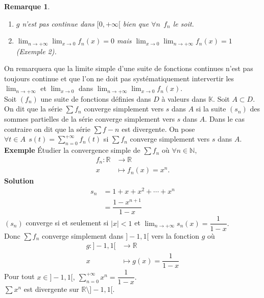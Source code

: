 \documentclass[11pt, a4paper]{book}
\newtheorem{rem}{Remarque}[section]
\begin{document}
\begin{rem} \label{rem4.2.1}
\begin{enumerate}
\item $g$ n'est pas continue dans $[0,+\infty[$ bien que $\forall n~~f_n$ le soit.
\item ${\displaystyle \lim_{n\rightarrow+\infty} \lim_{x\rightarrow0}f_n(x)=0}$ mais ${\displaystyle \lim_{x\rightarrow0} \lim_{n\rightarrow+\infty}f_n(x)=1}$ (Exemple 2).
\end{enumerate}
\end{rem}

On remarquera que la limite simple d'une suite de fonctions continues n'est pas toujours continue et que l'on ne doit pas syst\'ematiquement intervertir les ${\displaystyle \lim_{n\rightarrow+\infty}}$ et ${\displaystyle  \lim_{x\rightarrow0}}$ dans ${\displaystyle \lim_{n\rightarrow+\infty} \lim_{x\rightarrow0}f_n(x)}$.\\
Soit $(f_n)$ une suite de fonctions d\'efinies dans $D$ \`a valeurs dans $ \mathbb{K}$. Soit $A \subset D$. On dit que la s\'erie $\sum f_n$ converge simplement vers $s$ dans $A$ si la suite $(s_n)$ des sommes partielles de la s\'erie converge simplement vers $s$ dans $A$. Dans le cas contraire on dit que la s\'erie $\sum f-n$ est divergente. On pose $\forall t\in A ~~{\displaystyle s(t)=\sum_{n=0}^{+\infty} f_n(t)}$ si $\sum f_n$ converge simplement vers $s$ dans $A$.\\
\textbf{Exemple}\quad
\'Etudier la convergence simple de $\sum f_n$ o\`u $\forall n\in \mathbb{N},$ \begin{align*} f_n: \mathbb{R}& \longrightarrow \mathbb{R}\\ x& \longmapsto f_n(x)=x^n.\end{align*}
\textbf{Solution}\quad
\begin{align*} s_n&=1+x+x^2+\cdots+x^n\\ &=\dfrac{1-x^{n+1}}{1-x}\end{align*}
$(s_n)$ converge si et seulement si $|x|<1$ et ${\displaystyle \lim_{n\rightarrow+\infty} s_n(x)=\dfrac{1}{1-x}.}$\\
Donc $\sum f_n$ converge simplement dans $]-1,1[$ vers la fonction $g$ o\`u \begin{align*} g: ]-1,1[&\longrightarrow \mathbb{R}\\ x&\longmapsto g(x)=\dfrac{1}{1-x} \end{align*} 
Pour tout $x\in ]-1,1[,~{\displaystyle \sum_{n=0}^{+\infty} x^n=\dfrac{1}{1-x}.}$ \\
$\sum x^n$ est divergente sur $ \mathbb{R} \setminus ]-1,1[$.\\
\end{document}
